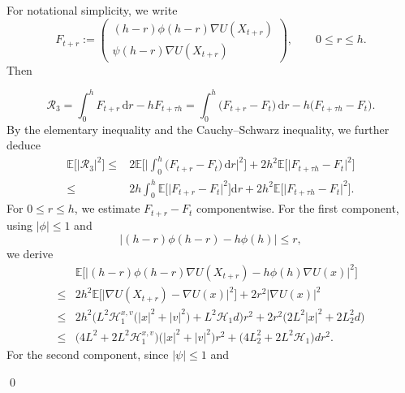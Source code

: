 \documentclass[12pt]{article}
\numberwithin{equation}{section}
\renewenvironment{proof}%
  {\begin{trivlist}%
   \item[]\ignorespaces}%
  {\qed\end{trivlist}}
\newcommand{\dd}{\mathrm{d}}
\begin{document}
\begin{proof}
For notational simplicity, we write
\begin{equation}
\label{eq:def-F}
F_{t+r}
:=
\left(
\begin{aligned}
(h-r)\phi(h-r)\nabla U(X_{t+r})
\\
\psi(h-r)\nabla U(X_{t+r})
\end{aligned}
\right),
\qquad 0\leq r\leq h .
\end{equation}
Then

%
\[
\mathcal R_3
=
\int_0^h F_{t+r}\,\dd r
-
hF_{t+\tau h}
=
\int_0^h
\big(
F_{t+r}-F_t
\big)\,\dd r
-
h
\big(
F_{t+\tau h}-F_t
\big).
\]
%
By the elementary inequality and the Cauchy--Schwarz inequality, we further deduce
\begin{equation}
\label{eq:R3-split-Ft}
\begin{aligned}
\mathbb E
\Big[\big|
\mathcal R_3
\big|^2\Big]
\leq&
2
\mathbb E
\bigg[
\bigg|
\int_0^h
\big(
F_{t+r}-F_t
\big)\,\dd r
\bigg|^2
\bigg]
+
2h^2
\mathbb E
\Big[
\big|
F_{t+\tau h}-F_t
\big|^2
\Big]
\\
\leq&
2h
\int_0^h
\mathbb E
\Big[
\big|
F_{t+r}-F_t
\big|^2
\Big]\dd r
+
2h^2
\mathbb E
\Big[
\big|
F_{t+\tau h}-F_t
\big|^2
\Big].
\end{aligned}
\end{equation}
For $0\leq r\leq h$, we estimate $F_{t+r}-F_t$ componentwise. 
For the first component, using $|\phi|\leq1$ and
\[
\big|
(h-r)\phi(h-r)-h\phi(h)
\big|
\leq r,
\]
we derive
\begin{equation}
\label{eq:Ftr-Ft-first}
\begin{aligned}
&
\mathbb E
\Big[
\big|
(h-r)\phi(h-r)\nabla U(X_{t+r})
-
h\phi(h)\nabla U(x)
\big|^2
\Big]
\\
\leq&
2h^2
\mathbb E
\Big[
\big|
\nabla U(X_{t+r})-\nabla U(x)
\big|^2
\Big]
+
2r^2|\nabla U(x)|^2
\\
\leq&
2h^2
\Big(
L^2\mathscr H^{x,v}_1
\big(
|x|^2+|v|^2
\big)
+
L^2\mathscr H_1d
\Big)r^2
+
2r^2
\big(
2L^2|x|^2+2L_2^2d
\big)
\\
\leq&
\Big(
4L^2
+
2L^2\mathscr H^{x,v}_1
\Big)
\big(
|x|^2+|v|^2
\big)r^2
+
\Big(
4L_2^2
+
2L^2\mathscr H_1
\Big)dr^2 .
\end{aligned}
\end{equation}
For the second component, since $|\psi|\leq1$ and

\end{proof}
\end{document}

